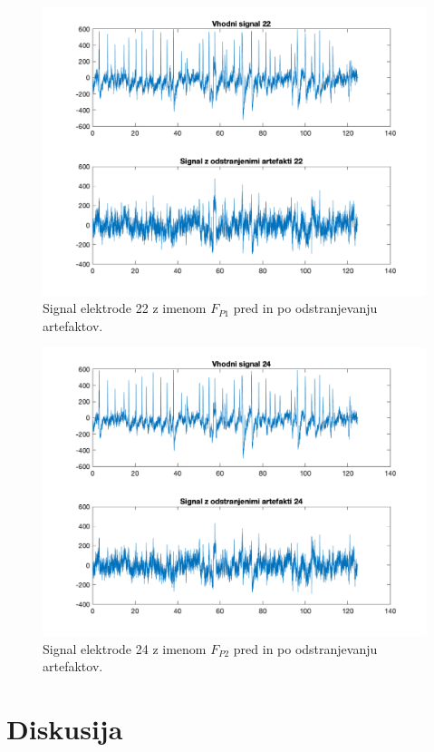 \documentclass[9pt]{IEEEtran}
\begin{document}
\begin{figure}[!htb]
\centering
\includegraphics[width=1\columnwidth]{22_insig_outsig.png}
\caption[c1]{ Signal elektrode 22 z imenom $F_{P1}$ pred in po odstranjevanju artefaktov.  }
\label{fig_5}
\end{figure}

\begin{figure}[!htb]
\centering
\includegraphics[width=1\columnwidth]{24_insig_outsig.png}
\caption[c1]{ Signal elektrode 24 z imenom $F_{P2}$ pred in po odstranjevanju artefaktov.}
\label{fig_6}
\end{figure}


\section{Diskusija}
\end{document}
